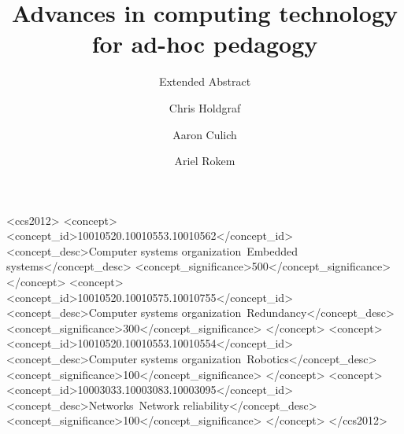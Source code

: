 \documentclass[sigconf]{acmart}
\begin{document}
\title{Advances in computing technology for ad-hoc pedagogy}

\subtitle{Extended Abstract}



\author{Chris Holdgraf}

\author{Aaron Culich}


\author{Ariel Rokem}



\renewcommand{\shortauthors}{C. Holdgraf et al.}




%
%
\begin{CCSXML}
<ccs2012>
 <concept>
  <concept_id>10010520.10010553.10010562</concept_id>
  <concept_desc>Computer systems organization~Embedded systems</concept_desc>
  <concept_significance>500</concept_significance>
 </concept>
 <concept>
  <concept_id>10010520.10010575.10010755</concept_id>
  <concept_desc>Computer systems organization~Redundancy</concept_desc>
  <concept_significance>300</concept_significance>
 </concept>
 <concept>
  <concept_id>10010520.10010553.10010554</concept_id>
  <concept_desc>Computer systems organization~Robotics</concept_desc>
  <concept_significance>100</concept_significance>
 </concept>
 <concept>
  <concept_id>10003033.10003083.10003095</concept_id>
  <concept_desc>Networks~Network reliability</concept_desc>
  <concept_significance>100</concept_significance>
 </concept>
</ccs2012>
\end{CCSXML}




\maketitle





\end{document}
